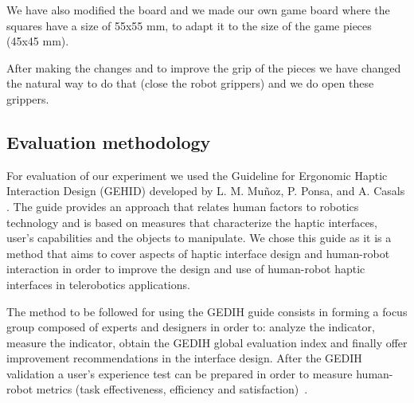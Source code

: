 \documentclass[journal,twoside]{JoPhA}
\begin{document}
We have also modified the board and we made our own game board where the squares have a size of 55x55 mm, to adapt it to the size of the game pieces (45x45 mm).

After making the changes and to improve the grip of the pieces we have changed the natural way to do that (close the robot grippers) and we do open these grippers.


\subsection{Evaluation methodology}

For evaluation of our experiment we used the Guideline for Ergonomic Haptic Interaction Design (GEHID) developed by L. M. Muñoz, P. Ponsa, and A. Casals \cite{Munoz12}. The guide provides an approach that relates human factors to robotics technology and is based on measures that characterize the haptic interfaces, user’s capabilities and the objects to manipulate. We chose this guide as it is a method that aims to cover aspects of haptic interface design and human-robot interaction in order to improve the design and use of human-robot haptic interfaces in telerobotics applications.

The method to be followed for using the GEDIH guide consists in forming a focus group composed of experts and designers in order to: analyze the indicator, measure the indicator, obtain the GEDIH global evaluation index and finally offer improvement recommendations in the interface design. After the GEDIH validation a user’s experience test can be prepared in order to measure human-robot metrics (task effectiveness, efficiency and satisfaction)~\cite{Andonovski10}.
\end{document}

